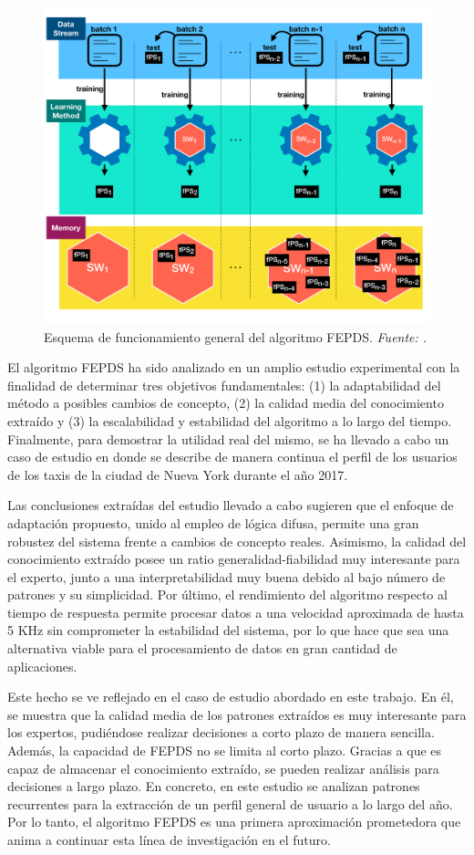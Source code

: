 \documentclass[c5paper,10pt,twoside]{book}	   	%
\begin{document}
\begin{figure}[!hbtp]
	\centering
	\includegraphics[width=0.7\linewidth]{./Figures/fepds.pdf}
	\caption[Esquema de funcionamiento general del algoritmo FEPDS.]{Esquema de funcionamiento general del algoritmo FEPDS. \textit{Fuente: \cite{Gcgd19a}.}}
	\label{fig:fepds}
\end{figure}

El algoritmo FEPDS ha sido analizado en un amplio estudio experimental con la finalidad de determinar tres objetivos fundamentales: (1) la adaptabilidad del método a posibles cambios de concepto, (2) la calidad media del conocimiento extraído y (3) la escalabilidad y estabilidad del algoritmo a lo largo del tiempo. Finalmente, para demostrar la utilidad real del mismo, se ha llevado a cabo un caso de estudio en donde se describe de manera continua el perfil de los usuarios de los taxis de la ciudad de Nueva York durante el año 2017.

Las conclusiones extraídas del estudio llevado a cabo sugieren que el enfoque de adaptación propuesto, unido al empleo de lógica difusa, permite una gran robustez del sistema frente a cambios de concepto reales. Asimismo, la calidad del conocimiento extraído posee un ratio generalidad-fiabilidad muy interesante para el experto, junto a una interpretabilidad muy buena debido al bajo número de patrones y su simplicidad. Por último, el rendimiento del algoritmo respecto al tiempo de respuesta permite procesar datos a una velocidad aproximada de hasta 5 KHz sin comprometer la estabilidad del sistema, por lo que hace que sea una alternativa viable para el procesamiento de datos en gran cantidad de aplicaciones.

Este hecho se ve reflejado en el caso de estudio abordado en este trabajo. En él, se muestra que la calidad media de los patrones extraídos es muy interesante para los expertos, pudiéndose realizar decisiones a corto plazo de manera sencilla. Además, la capacidad de FEPDS no se limita al corto plazo. Gracias a que es capaz de almacenar el conocimiento extraído, se pueden realizar análisis para decisiones a largo plazo. En concreto, en este estudio se analizan patrones recurrentes para la extracción de un perfil general de usuario a lo largo del año. Por lo tanto, el algoritmo FEPDS es una primera aproximación prometedora que anima a continuar esta línea de investigación en el futuro.
\end{document}
